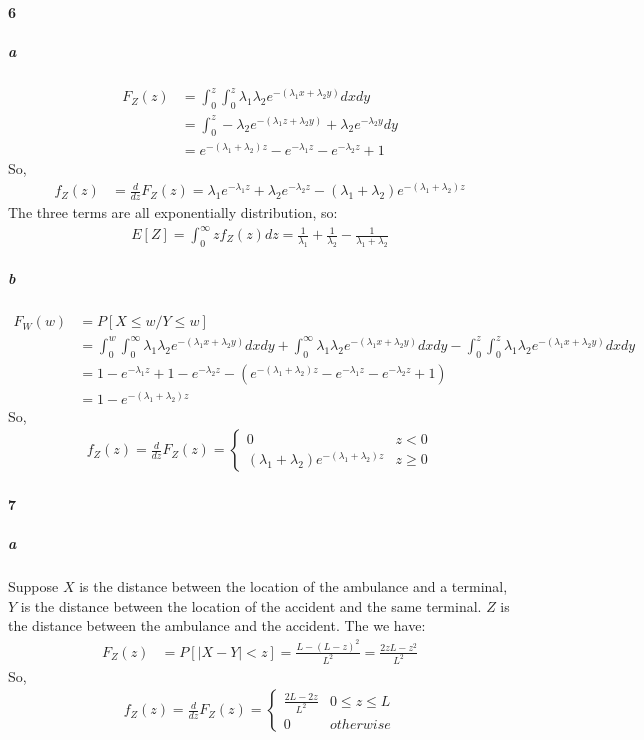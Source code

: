 \documentclass[22pt]{article}
\begin{document}
	\paragraph{6}
		\subparagraph{a}
		\begin{align}
		F_Z(z) & = \int_{0}^{z}\int_{0}^{z}\lambda_1 \lambda_2e^{-(\lambda_1x+\lambda_2y)}dxdy\\
		& = \int_{0}^{z}-\lambda_2e^{-(\lambda_1z+\lambda_2y)} + \lambda_2e^{-\lambda_2y}dy\\
		& = e^{-(\lambda_1+\lambda_2)z}-e^{-\lambda_1z}-e^{-\lambda_2z} + 1
		\end{align}
		So,
		\begin{align}
		f_Z(z) & =  \frac{d}{dz}F_Z(z) = \lambda_1e^{-\lambda_1z} + \lambda_2e^{-\lambda_2z} - (\lambda_1+\lambda_2)e^{-(\lambda_1+\lambda_2)z}
		\end{align}
		The three terms are all exponentially distribution, so:
		\begin{align}
		E[Z] = \int_{0}^{\infty}zf_Z(z) dz = \frac{1}{\lambda_1} +  \frac{1}{\lambda_2} -  \frac{1}{\lambda_1+\lambda_2}
		\end{align}

		\subparagraph{b}
		\begin{align}
		F_W(w) & = P[X\leq w/ Y\leq w]\\
		& = \int_{0}^{w} \int_{0}^{\infty} \lambda_1 \lambda_2e^{-(\lambda_1 x+ \lambda_2y)} dxdy + \int_{0}^{\infty} \lambda_1 \lambda_2e^{-(\lambda_1 x+ \lambda_2y)} dxdy - \int_{0}^{z} \int_{0}^{z} \lambda_1 \lambda_2e^{-(\lambda_1 x+ \lambda_2y)} dxdy\\
		& = 1-e^{-\lambda_1 z} + 1 -e^{-\lambda_2 z}-( e^{-(\lambda_1+\lambda_2)z}-e^{-\lambda_1z}-e^{-\lambda_2z} + 1)\\
		& = 1-e^{-(\lambda_1+\lambda_2)z}
		\end{align}
		So, \begin{align}
		f_Z(z) = \frac{d}{dz}F_Z(z) =
				\begin{cases}
				0 & z < 0\\
				(\lambda_1+\lambda_2)e^{-(\lambda_1+\lambda_2)z} &  z \geq 0
				\end{cases}
	\end{align}

	\paragraph{7}
	\subparagraph{a}
	Suppose $X$ is the distance between the location of the ambulance and a terminal, $Y$ is the distance between the location of the accident and the same terminal. $Z$ is the distance between the ambulance and the accident. The we have:
	\begin{align}
	F_Z(z) & = P[|X-Y|<z] = \frac{L-(L-z)^2}{L^2} = \frac{2zL-z^2}{L^2}
	\end{align}
	So,
	\begin{align}
	f_Z(z) = \frac{d}{dz}F_Z(z)=
	\begin{cases}
				\frac{2L-2z}{L^2} & 0 \leq z \leq L\\
				0 & otherwise
				\end{cases} 
	\end{align}
\end{document}
